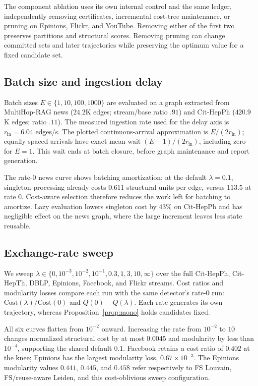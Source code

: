 The component ablation uses its own internal control and the same ledger,
independently removing certificates, incremental cost-tree maintenance,
or pruning on Epinions, Flickr, and YouTube. Removing either of the first
two preserves partitions and structural scores. Removing pruning can
change committed sets and later trajectories while preserving the optimum
value for a fixed candidate set.

\subsection{Batch size and ingestion delay}\label{app:exp3-detail}

Batch sizes $E\in\{1,10,100,1000\}$ are evaluated on a graph extracted
from MultiHop-RAG news ($24.2$K edges; stream/base ratio $.91$) and
Cit-HepPh ($420.9$K edges; ratio $.11$). The measured ingestion rate used
for the delay axis is $r_{\mathrm{in}}=6.04$ edges/s. The plotted
continuous-arrival approximation is $E/(2r_{\mathrm{in}})$;
equally spaced arrivals have exact mean wait $(E-1)/(2r_{\mathrm{in}})$,
including zero for $E=1$. This wait ends at batch closure, before graph
maintenance and report generation.

The rate-$0$ news curve shows batching amortization; at the default
$\lambda=0.1$, singleton processing already costs $0.611$ structural units
per edge, versus $113.5$ at rate $0$. Cost-aware selection therefore
reduces the work left for batching to amortize. Lazy evaluation lowers
singleton cost by $43\%$ on Cit-HepPh and has negligible effect on the
news graph, where the large increment leaves less state reusable.

\subsection{Exchange-rate sweep}\label{app:exp4-detail}

We sweep $\lambda\in\{0,10^{-3},10^{-2},10^{-1},0.3,1,3,10,\infty\}$
over the full Cit-HepPh, Cit-HepTh, DBLP, Epinions, Facebook, and Flickr
streams. Cost ratios and modularity losses compare each run with the same
detector's rate-$0$ run: $\mathrm{Cost}(\lambda)/\mathrm{Cost}(0)$ and
$\bar Q(0)-\bar Q(\lambda)$. Each rate generates its own trajectory,
whereas Proposition~\ref{prop:mono} holds candidates fixed.

All six curves flatten from $10^{-2}$ onward. Increasing the rate from
$10^{-2}$ to $10$ changes normalized structural cost by at most $0.0045$
and modularity by less than $10^{-4}$, supporting the shared default $0.1$.
Facebook retains a cost ratio of $0.402$ at the knee; Epinions has the
largest modularity loss, $0.67\times10^{-3}$. The Epinions modularity
values $0.441$, $0.445$, and $0.458$ refer respectively to FS Louvain,
FS/reuse-aware Leiden, and this cost-oblivious sweep configuration.


